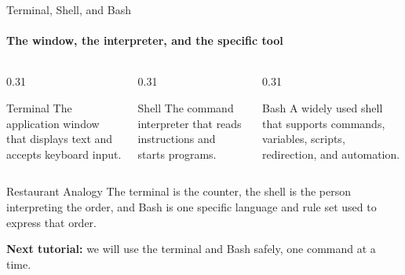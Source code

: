 

\begin{frame}{Terminal, Shell, and Bash}
\framesubtitle{The window, the interpreter, and the specific tool}

\begin{columns}[T,onlytextwidth]
    \begin{column}{0.31\textwidth}
        \begin{block}{Terminal}
            The application window that displays text and accepts keyboard input.
        \end{block}
    \end{column}
    \hfill
    \begin{column}{0.31\textwidth}
        \begin{block}{Shell}
            The command interpreter that reads instructions and starts programs.
        \end{block}
    \end{column}
    \hfill
    \begin{column}{0.31\textwidth}
        \begin{block}{Bash}
            A widely used shell that supports commands, variables, scripts,
            redirection, and automation.
        \end{block}
    \end{column}
\end{columns}

\pause

\begin{exampleblock}{Restaurant Analogy}
    The terminal is the counter, the shell is the person interpreting the order,
    and Bash is one specific language and rule set used to express that order.
\end{exampleblock}

\begin{center}
    \textbf{Next tutorial:} we will use the terminal and Bash safely,
    one command at a time.
\end{center}
\end{frame}


